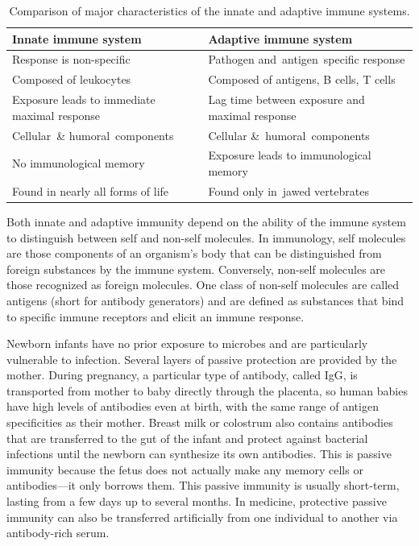 \begin{table}[!h]
\caption{\label{tab:immunecomparison}Comparison of major characteristics of the innate and adaptive immune systems.}
\centering
\begin{tabular}[t]{>{\raggedright\arraybackslash}p{13em}>{\raggedright\arraybackslash}p{13em}}
\toprule
Innate immune system & Adaptive immune system\\
\midrule
\rowcolor{gray!6}  Response is non-specific & Pathogen and antigen specific response\\
Composed of leukocytes & Composed of antigens, B cells, T cells\\
\rowcolor{gray!6}  Exposure leads to immediate maximal response & Lag time between exposure and maximal response\\
Cellular \& humoral components & Cellular \& humoral components\\
\rowcolor{gray!6}  No immunological memory & Exposure leads to immunological memory\\
\addlinespace
Found in nearly all forms of life & Found only in jawed vertebrates\\
\bottomrule
\end{tabular}
\end{table}

Both innate and adaptive immunity depend on the ability of the immune system to distinguish between self and non-self molecules. In immunology, self molecules are those components of an organism's body that can be distinguished from foreign substances by the immune system. Conversely, non-self molecules are those recognized as foreign molecules. One class of non-self molecules are called antigens (short for antibody generators) and are defined as substances that bind to specific immune receptors and elicit an immune response.

Newborn infants have no prior exposure to microbes and are particularly vulnerable to infection. Several layers of passive protection are provided by the mother. During pregnancy, a particular type of antibody, called IgG, is transported from mother to baby directly through the placenta, so human babies have high levels of antibodies even at birth, with the same range of antigen specificities as their mother. Breast milk or colostrum also contains antibodies that are transferred to the gut of the infant and protect against bacterial infections until the newborn can synthesize its own antibodies. This is passive immunity because the fetus does not actually make any memory cells or antibodies---it only borrows them. This passive immunity is usually short-term, lasting from a few days up to several months. In medicine, protective passive immunity can also be transferred artificially from one individual to another via antibody-rich serum.

